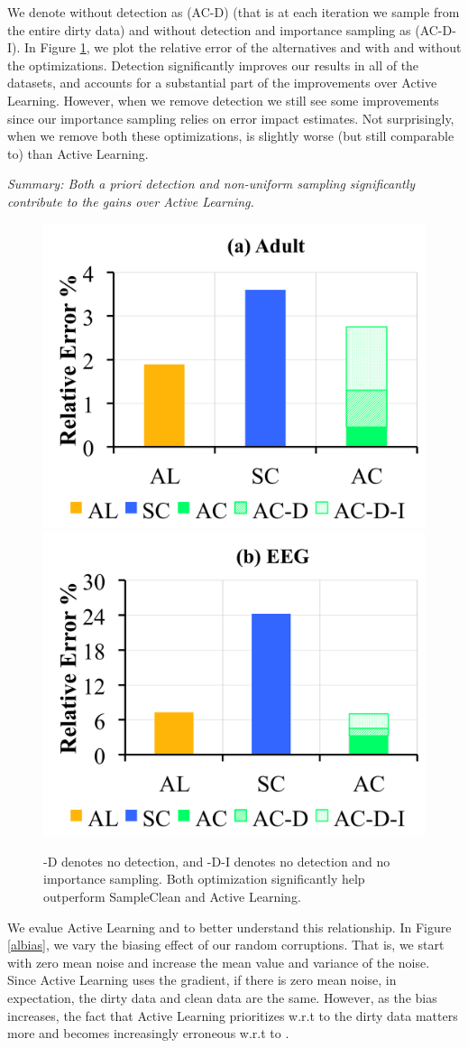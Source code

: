 We denote \sys without detection as (AC-D) (that is at each iteration we sample from the entire dirty data) and \sys without detection and importance sampling as (AC-D-I).
In Figure \ref{opts}, we plot the relative error of the alternatives and \sys with and without the optimizations.
Detection significantly improves our results in all of the datasets, and accounts for a substantial part of the improvements over Active Learning.
However, when we remove detection we still see some improvements since our importance sampling relies on error impact estimates.
Not surprisingly, when we remove both these optimizations, \sys is slightly worse (but still comparable to) than Active Learning.

\vspace{0.25em}

\noindent \emph{Summary: Both a priori detection and non-uniform sampling significantly contribute to the gains over Active Learning.}

\begin{figure}[ht!]
\centering
 \includegraphics[width=0.49\columnwidth]{exp/exp8a.png}
 \includegraphics[width=0.49\columnwidth]{exp/exp8b.png}
 \caption{ -D denotes no detection, and -D-I denotes no detection and no importance sampling. Both optimization significantly help \sys outperform SampleClean and Active Learning. \label{opts}}
\end{figure}

\iffalse
We evalue Active Learning and \sys to better understand this relationship.
In Figure \ref{albias}, we vary the biasing effect of our random corruptions.
That is, we start with zero mean noise and increase the mean value and variance of the noise.
Since Active Learning uses the gradient, if there is zero mean noise, in expectation, the dirty data and clean data are the same.
However, as the bias increases, the fact that Active Learning prioritizes w.r.t to the dirty data matters more and becomes increasingly erroneous w.r.t to \sys.

